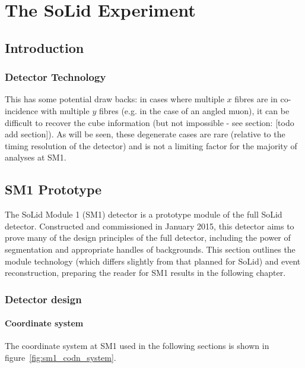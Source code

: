 {
\chapter{The SoLid Experiment}
\section{Introduction}

\subsection{Detector Technology}
This has some potential draw backs: in cases where multiple $x$ fibres are in co-incidence with multiple $y$ fibres (e.g. in the case of an angled muon), it can be difficult to recover the cube information (but not impossible - see section: [todo add section]). As will be seen, these degenerate cases are rare (relative to the timing resolution of the detector) and is not a limiting factor for the majority of analyses at SM1.

\section{SM1 Prototype}
The SoLid Module 1 (SM1) detector is a prototype module of the full SoLid detector. Constructed and commissioned in January 2015, this detector aims to prove many of the design principles of the full detector, including the power of segmentation and appropriate handles of backgrounds. This section outlines the module technology (which differs slightly from that planned for SoLid) and event reconstruction, preparing the reader for SM1 results in the following chapter. 

\subsection{Detector design}
\subsubsection{Coordinate system}
The coordinate system at SM1 used in the following sections is shown in figure~\ref{fig:sm1_codn_system}.

}
